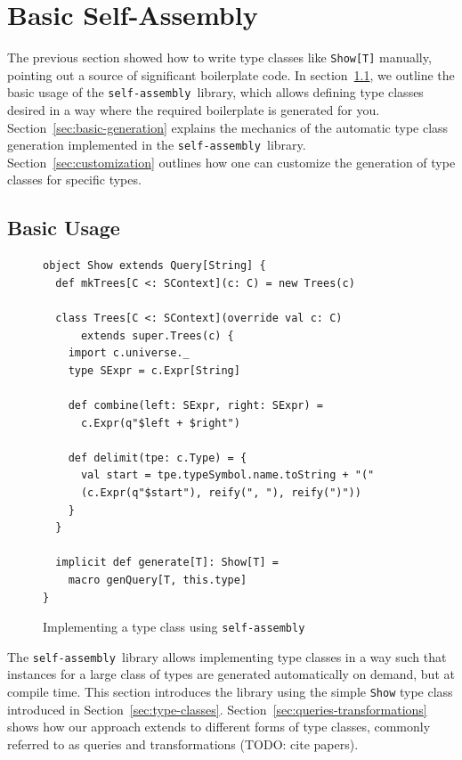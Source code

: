 \documentclass[preprint]{sigplanconf}
\newcommand{\selfassembly}{\texttt{self-assembly~}}
\begin{document}
\section{Basic Self-Assembly}
\label{sec:basic-self-assembly}


The previous section showed how to write type classes like \verb|Show[T]|
manually, pointing out a source of significant boilerplate code. In
section~\ref{sec:basic-usage}, we outline the basic usage of the
\selfassembly library, which allows defining type classes desired in a way
where the required boilerplate is generated for you.
Section~\ref{sec:basic-generation} explains the mechanics of the automatic
type class generation implemented in the \selfassembly library.
Section~\ref{sec:customization} outlines how one can customize the generation
of type classes for specific types.

\subsection{Basic Usage}
\label{sec:basic-usage}

\begin{figure}
\centering
\begin{lstlisting}
object Show extends Query[String] {
  def mkTrees[C <: SContext](c: C) = new Trees(c)

  class Trees[C <: SContext](override val c: C)
      extends super.Trees(c) {
    import c.universe._
    type SExpr = c.Expr[String]

    def combine(left: SExpr, right: SExpr) =
      c.Expr(q"$left + $right")

    def delimit(tpe: c.Type) = {
      val start = tpe.typeSymbol.name.toString + "("
      (c.Expr(q"$start"), reify(", "), reify(")"))
    }
  }

  implicit def generate[T]: Show[T] =
    macro genQuery[T, this.type]
}
\end{lstlisting}
  \caption{Implementing a type class using \selfassembly}
  \label{fig:basic-usage}
\end{figure}

The \selfassembly library allows implementing type classes in a way such that
instances for a large class of types are generated automatically on demand, but at compile time.
This section introduces the library using the simple \verb|Show| type class
introduced in Section~\ref{sec:type-classes}. Section~\ref{sec:queries-transformations}
shows how our approach extends to different forms of type classes, commonly referred to
as queries and transformations (TODO: cite papers).
\end{document}
